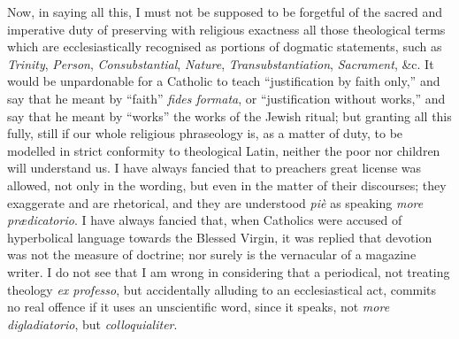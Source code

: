 Now, in saying all this, I must not be supposed to
be forgetful of the sacred and imperative duty of preserving with
religious exactness all those theological terms which are
ecclesiastically recognised as portions of dogmatic statements, such as \emph{Trinity},
\emph{Person}, \emph{Consubstantial}, \emph{Nature}, \emph{Transubstantiation},
\emph{Sacrament}, \&c. It would be unpardonable for a Catholic to
teach ``justification by faith only,'' and say that he meant by ``faith'' \emph{fides
formata}, or ``justification without works,'' and say that he meant by ``works''
the works of the Jewish ritual; but granting all this fully, still if
our whole religious phraseology is, as a matter of duty, to be modelled
in strict conformity to theological Latin, neither the poor nor children
will understand us. I have always fancied that to preachers great
license was allowed, not only in the wording, but even in the matter of
their discourses; they exaggerate and are rhetorical, and they are
understood \emph{piè} as speaking \emph{more prædicatorio}. I have
always fancied that, when Catholics were accused of hyperbolical
language towards the Blessed Virgin, it was replied that devotion was
not the measure of doctrine; nor surely is the vernacular of a magazine
writer. I do not see that I am wrong in considering that a periodical,
not treating theology \emph{ex professo}, but accidentally alluding to
an ecclesiastical act, commits no real offence if it uses an
unscientific word, since it speaks, not \emph{more digladiatorio}, but \emph{colloquialiter}.

